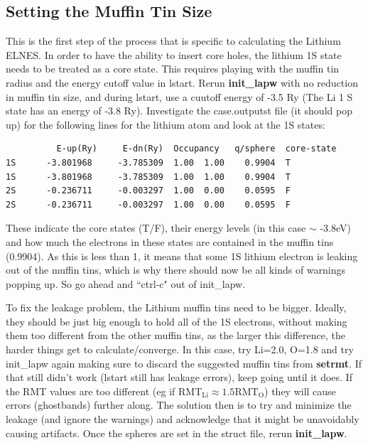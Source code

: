 \documentclass[12pt]{article}
\begin{document}
\subsection{Setting the Muffin Tin Size}
This is the first step of the process that is specific to calculating the Lithium ELNES.  In order to have the ability to insert core holes, the lithium 1S state needs to be treated as a core state.  This requires playing with the muffin tin radius and the energy cutoff value in lstart.  Rerun \textbf{init\_lapw} with no reduction in muffin tin size, and during lstart, use a cuutoff energy of -3.5 Ry (The Li 1 S state has an energy of -3.8 Ry).  Investigate the case.outputst file (it should pop up) for the following lines for the lithium atom and look at the 1S states: 


\begin{lstlisting}
          E-up(Ry)     E-dn(Ry)  Occupancy   q/sphere  core-state
1S      -3.801968     -3.785309  1.00  1.00    0.9904  T
1S      -3.801968     -3.785309  1.00  1.00    0.9904  T
2S      -0.236711     -0.003297  1.00  0.00    0.0595  F
2S      -0.236711     -0.003297  1.00  0.00    0.0595  F

\end{lstlisting}

These indicate the core states (T/F), their energy levels (in this case $\sim$ -3.8eV) and how much the electrons in these states are contained in the muffin tins (0.9904).  As this is less than 1, it means that some 1S lithium electron is leaking out of the muffin tins, which is why there should now be all kinds of warnings popping up.  So go ahead and ``ctrl-c" out of init\_lapw.


To fix the leakage problem, the Lithium muffin tins need to be bigger.   Ideally, they should be just big enough to hold all of the 1S electrons, without making them too different from the other muffin tins, as the larger this difference, the harder things get to calculate/converge.  In this case, try Li=2.0, O=1.8 and try init\_lapw again making sure to discard the suggested muffin tins from \textbf{setrmt}. If that still didn't work (lstart still has leakage errors), keep going until it does.  If the RMT values are too different (eg if $\mathrm{RMT_{Li}} \approx 1.5 \mathrm{RMT_O}$) they will cause errors  (ghostbands) further along.  The solution then is to try and minimize the leakage (and ignore the warnings) and acknowledge that it might be unavoidably causing artifacts. Once the spheres are set in the struct file, rerun \textbf{init\_lapw}.
\end{document}
